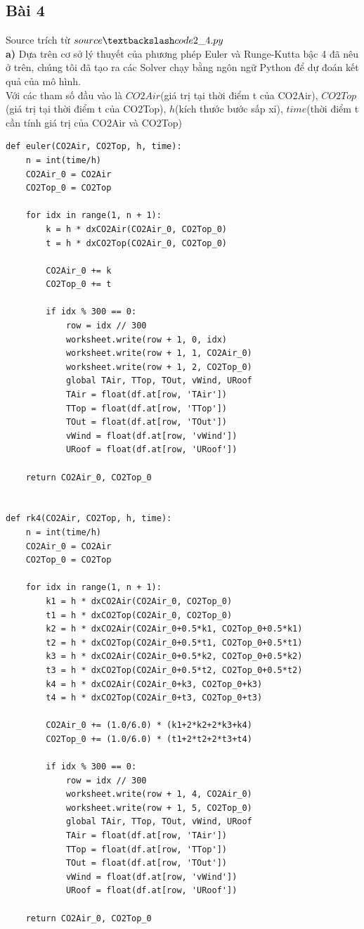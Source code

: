 \documentclass[a4paper]{article}
\begin{document}
\subsection{Bài 4}
Source trích từ $source\textbackslash code2\_4.py$\\
\textbf{a)} Dựa trên cơ sở lý thuyết của phương phép Euler và Runge-Kutta bậc 4 đã nêu ở trên, chúng tôi đã tạo ra các Solver chạy bằng ngôn ngữ Python để dự đoán kết quả của mô hình.\\
Với các tham số đầu vào là $CO2Air$(giá trị tại thời điểm t của CO2Air), $CO2Top$(giá trị tại thời điểm t của CO2Top), $h$(kích thước bước sấp xỉ), $time$(thời điểm t cần tính giá trị của CO2Air và CO2Top)

\begin{verbatim}
def euler(CO2Air, CO2Top, h, time):
    n = int(time/h)
    CO2Air_0 = CO2Air
    CO2Top_0 = CO2Top

    for idx in range(1, n + 1):
        k = h * dxCO2Air(CO2Air_0, CO2Top_0)
        t = h * dxCO2Top(CO2Air_0, CO2Top_0)

        CO2Air_0 += k
        CO2Top_0 += t

        if idx % 300 == 0:
            row = idx // 300
            worksheet.write(row + 1, 0, idx)
            worksheet.write(row + 1, 1, CO2Air_0)
            worksheet.write(row + 1, 2, CO2Top_0)
            global TAir, TTop, TOut, vWind, URoof
            TAir = float(df.at[row, 'TAir'])
            TTop = float(df.at[row, 'TTop'])
            TOut = float(df.at[row, 'TOut'])
            vWind = float(df.at[row, 'vWind'])
            URoof = float(df.at[row, 'URoof'])

    return CO2Air_0, CO2Top_0


def rk4(CO2Air, CO2Top, h, time):
    n = int(time/h)
    CO2Air_0 = CO2Air
    CO2Top_0 = CO2Top

    for idx in range(1, n + 1):
        k1 = h * dxCO2Air(CO2Air_0, CO2Top_0)
        t1 = h * dxCO2Top(CO2Air_0, CO2Top_0)
        k2 = h * dxCO2Air(CO2Air_0+0.5*k1, CO2Top_0+0.5*k1)
        t2 = h * dxCO2Top(CO2Air_0+0.5*t1, CO2Top_0+0.5*t1)
        k3 = h * dxCO2Air(CO2Air_0+0.5*k2, CO2Top_0+0.5*k2)
        t3 = h * dxCO2Top(CO2Air_0+0.5*t2, CO2Top_0+0.5*t2)
        k4 = h * dxCO2Air(CO2Air_0+k3, CO2Top_0+k3)
        t4 = h * dxCO2Top(CO2Air_0+t3, CO2Top_0+t3)

        CO2Air_0 += (1.0/6.0) * (k1+2*k2+2*k3+k4)
        CO2Top_0 += (1.0/6.0) * (t1+2*t2+2*t3+t4)

        if idx % 300 == 0:
            row = idx // 300
            worksheet.write(row + 1, 4, CO2Air_0)
            worksheet.write(row + 1, 5, CO2Top_0)
            global TAir, TTop, TOut, vWind, URoof
            TAir = float(df.at[row, 'TAir'])
            TTop = float(df.at[row, 'TTop'])
            TOut = float(df.at[row, 'TOut'])
            vWind = float(df.at[row, 'vWind'])
            URoof = float(df.at[row, 'URoof'])

    return CO2Air_0, CO2Top_0

\end{verbatim}
\end{document}
